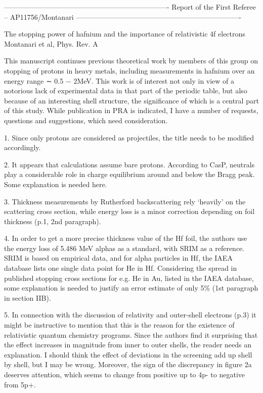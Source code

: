
----------------------------------------------------------------------
Report of the First Referee -- AP11756/Montanari
----------------------------------------------------------------------

The stopping power of hafnium and the importance of relativistic 4f electrons
Montanari et al, Phys. Rev. A

This manuscript continues previous theoretical work by members of this 
group on stopping of protons in heavy metals, including measurements in 
hafnium over an energy range ∼ 0.5 − 2MeV. This work is of interest not 
only in view of a notorious lack of experimental data in that part of 
the periodic table, but also because of an interesting shell structure, 
the significance of which is a central part of this study. While 
publication in PRA is indicated, I have a number of requests, questions 
and suggestions, which need consideration.

1. Since only protons are considered as projectiles, the title needs to 
be modified accordingly.

2. It appears that calculations assume bare protons. According to CasP, 
neutrals play a considerable role in charge equilibrium around and 
below the Bragg peak. Some explanation is needed here.

3. Thickness measurements by Rutherford backscattering rely ‘heavily’ 
on the scattering cross section, while energy loss is a minor correction 
depending on foil thickness (p.1, 2nd paragraph).

4. In order to get a more precise thickness value of the Hf foil, the 
authors use the energy loss of 5.486 MeV alphas as a standard, with 
SRIM as a reference. SRIM is based on empirical data, and for alpha 
particles in Hf, the IAEA database lists one single data point for He 
in Hf. Considering the spread in published stopping cross sections for 
e.g. He in Au, listed in the IAEA database, some explanation is needed 
to justify an error estimate of only 5\% (1st paragraph in section IIB).

5. In connection with the discussion of relativity and outer-shell 
electrons (p.3) it might be instructive to mention that this is the 
reason for the existence of relativistic quantum chemistry programs. 
Since the authors find it surprising that the effect increases in 
magnitude from inner to outer shells, the reader needs an explanation. 
I should think the effect of deviations in the screening add up shell 
by shell, but I may be wrong. Moreover, the sign of the discrepancy in 
figure 2a deserves attention, which seems to change from positive up to 
4p- to negative from 5p+.

